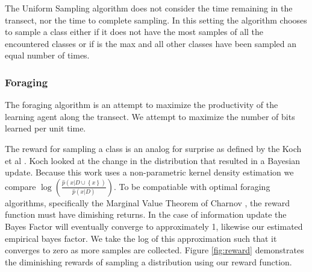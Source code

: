 The Uniform Sampling algorithm does not consider the time remaining in the
transect, nor the time to complete sampling.  In this setting the algorithm
chooses to sample a class either if it does not have the most samples of all
the encountered classes or if is the max and all other classes have been
sampled an equal number of times.

\subsubsection{Foraging}

The foraging algorithm is an attempt to maximize the productivity of the learning agent along the transect.  We attempt to maximize the number of bits learned per unit time.

The reward for sampling a class is an analog for surprise as
defined by the Koch et al \cite{itti2009bayesian}.  Koch looked at the change
in the distribution that resulted in a Bayesian update.  Because this work
uses a non-parametric kernel density estimation we compare
$\log\left(\frac{\hat{p}(x|D\cup \left\{x\right\})}{\hat{p}(x|D)}\right)$.  To
be compatiable with optimal foraging algorithms, specifically the Marginal
Value Theorem of Charnov \cite{charnov1973optimal}, the reward function must
have dimishing returns.  In the case of information update the Bayes Factor
will eventually converge to approximately 1, likewise our estimated empirical
bayes factor.  We take the log of this approximation such that it converges to
zero as more samples are collected.  Figure \ref{fig:reward} demonstrates the diminishing rewards of sampling a distribution using our reward function.



